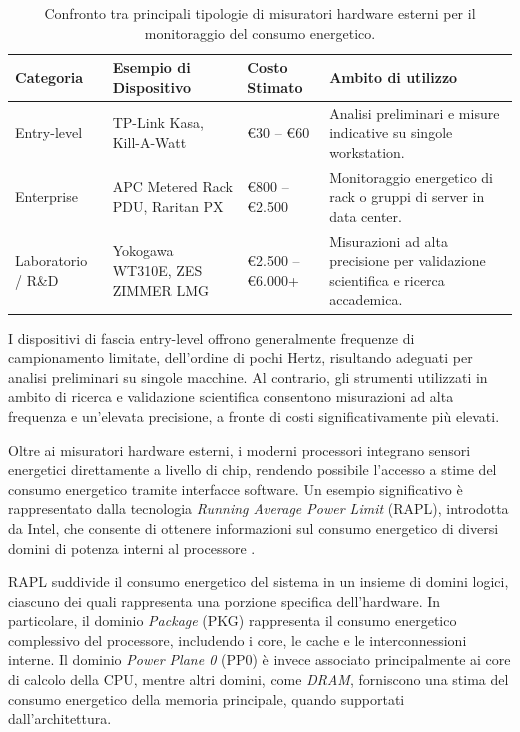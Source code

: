 \begin{table}[t]
\centering
\caption{Confronto tra principali tipologie di misuratori hardware esterni per il
monitoraggio del consumo energetico.}
\label{tab:costi_hardware}
\begin{tabular}{|l|p{4cm}|p{3cm}|p{4cm}|}
\hline
\textbf{Categoria} & \textbf{Esempio di Dispositivo} & \textbf{Costo Stimato} & \textbf{Ambito di utilizzo} \\ \hline
Entry-level &
TP-Link Kasa, Kill-A-Watt &
€30 -- €60 &
Analisi preliminari e misure indicative su singole workstation. \\ \hline
Enterprise &
APC Metered Rack PDU, Raritan PX &
€800 -- €2.500 &
Monitoraggio energetico di rack o gruppi di server in data center. \\ \hline
Laboratorio / R\&D &
Yokogawa WT310E, ZES ZIMMER LMG &
€2.500 -- €6.000+ &
Misurazioni ad alta precisione per validazione scientifica e ricerca accademica. \\ \hline
\end{tabular}
\end{table}

I dispositivi di fascia entry-level offrono generalmente frequenze di campionamento
limitate, dell’ordine di pochi Hertz, risultando adeguati per analisi preliminari su
singole macchine.
Al contrario, gli strumenti utilizzati in ambito di ricerca e validazione
scientifica consentono misurazioni ad alta frequenza e un’elevata precisione, a
fronte di costi significativamente più elevati.

Oltre ai misuratori hardware esterni, i moderni processori integrano sensori
energetici direttamente a livello di chip, rendendo possibile l’accesso a stime
del consumo energetico tramite interfacce software.
Un esempio significativo è rappresentato dalla tecnologia \textit{Running Average
Power Limit} (RAPL), introdotta da Intel, che consente di ottenere informazioni
sul consumo energetico di diversi domini di potenza interni al processore
\cite{intel-rapl, rapl_description}.

RAPL suddivide il consumo energetico del sistema in un insieme di domini logici,
ciascuno dei quali rappresenta una porzione specifica dell’hardware.
In particolare, il dominio \textit{Package} (PKG) rappresenta il consumo energetico
complessivo del processore, includendo i core, le cache e le interconnessioni interne.
Il dominio \textit{Power Plane 0} (PP0) è invece associato principalmente ai core
di calcolo della CPU, mentre altri domini, come \textit{DRAM}, forniscono una stima
del consumo energetico della memoria principale, quando supportati
dall’architettura.

